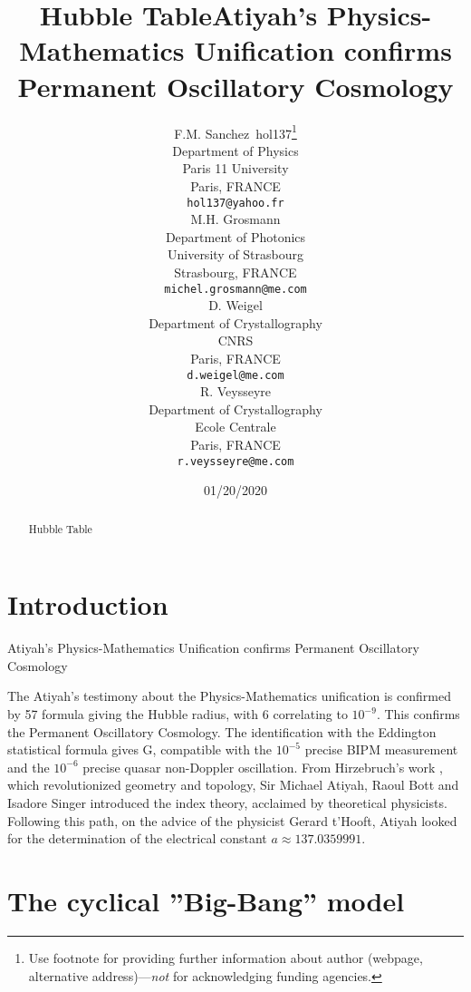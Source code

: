 \documentclass[a4paper,9pt]{article}
\title{Hubble Table}
\date{01/20/2020}
\title{Atiyah's Physics-Mathematics Unification confirms Permanent Oscillatory Cosmology}
\author{
  F.M. Sanchez~hol137\thanks{Use footnote for providing further
    information about author (webpage, alternative
    address)---\emph{not} for acknowledging funding agencies.} \\
  Department of Physics\\
  Paris 11 University\\
  Paris, FRANCE \\
  \texttt{hol137@yahoo.fr} \\
   \And
 M.H. Grosmann \\
  Department of Photonics\\
  University of Strasbourg\\
  Strasbourg, FRANCE \\
  \texttt{michel.grosmann@me.com} \\
   \And
 D. Weigel \\
  Department of Crystallography\\
  CNRS\\
  Paris, FRANCE \\
  \texttt{d.weigel@me.com} \\
   \And
 R. Veysseyre \\
  Department of Crystallography\\
  Ecole Centrale\\
  Paris, FRANCE \\
  \texttt{r.veysseyre@me.com} \\
}
\begin{document}
\maketitle

\begin{abstract}
Hubble Table
\end{abstract}




\section{Introduction}
Atiyah's Physics-Mathematics Unification confirms Permanent Oscillatory Cosmology

The Atiyah's testimony about the Physics-Mathematics unification is confirmed by 57 formula
giving the Hubble radius, with 6 correlating to $10^{-9}$. This confirms the Permanent Oscillatory
Cosmology. The identification with the Eddington statistical formula gives G, compatible with the
$10^{-5}$ precise BIPM measurement and the $10^{-6}$ precise quasar non-Doppler oscillation.
From Hirzebruch's work \cite{Hirzebruch}, which revolutionized geometry and topology, Sir Michael Atiyah,
Raoul Bott and Isadore Singer introduced the index theory, acclaimed by theoretical physicists.
Following this path, on the advice of the physicist Gerard t'Hooft, Atiyah looked for the
determination of the electrical constant $a \approx 137.0359991$. 


\section{The cyclical ”Big-Bang” model}
\label{sec:headings}
\end{document}
